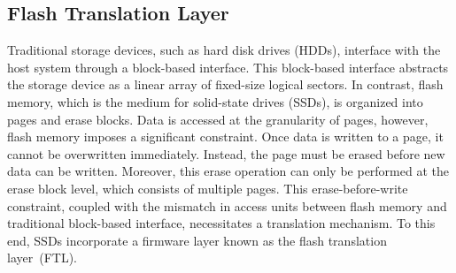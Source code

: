 \subsection{Flash Translation Layer}\label{ss:ftl}

\begin{comment}
Programs based on the filesystem of a typical operating system recognize disks on a sector basis.
However, in the case of SSDs, storage units are implemented based on pages and blocks.
This means that sector-based programs cannot write directly to SSDs.
Nevertheless, SSDs can easily accommodate these programs because they use the same host interface as HDDs.
To facilitate this, something is needed to assist SSDs in writing for sector-based programs, which is known as the Flash Translation Layer (FTL).

FTL performs two important functions within the SSD: Logical Block Mapping and Garbage Collection (GC).
FTL is responsible for converting logical addresses to physical address values to store logical sectors in physical pages, which is referred to as logical block mapping.
Block mapping is stored in the SSD's memory for quick access and consists of a table containing Logical Block Addresses (LBA) and Physical Block Addresses (PBA).
Additionally, SSDs cannot perform in-place updates.
Therefore, when new data arrives, existing data must be deleted before the new data can be stored.
At this time, the SSD uses GC to preemptively free up space for deleted data, which also contributes to the durability of the SSD.

In this study, we copy and store information from the SSD.
However, accessing the SSD's FTL from the outside is not feasible due to reasons such as security and complexity.
\end{comment}

Traditional storage devices, such as hard disk drives (HDDs), interface with the host system through a block-based interface.
This block-based interface abstracts the storage device as a linear array of fixed-size logical sectors.
In contrast, flash memory, which is the medium for solid-state drives (SSDs), is organized into pages and erase blocks.
Data is accessed at the granularity of pages, however, flash memory imposes a significant constraint.
Once data is written to a page, it cannot be overwritten immediately.
Instead, the page must be erased before new data can be written.
Moreover, this erase operation can only be performed at the erase block level, which consists of multiple pages.
This erase-before-write constraint, coupled with the mismatch in access units between flash memory and traditional block-based interface, necessitates a translation mechanism.
To this end, SSDs incorporate a firmware layer known as the flash translation layer~(FTL).


